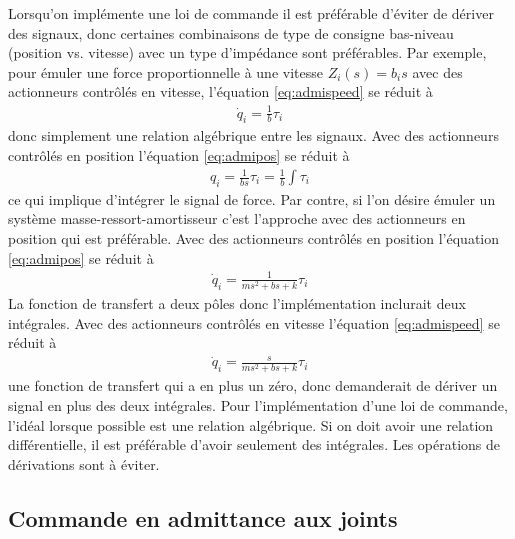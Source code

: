 Lorsqu'on implémente une loi de commande il est préférable d'éviter de dériver des signaux, donc certaines combinaisons de type de consigne bas-niveau (position vs. vitesse) avec un type d'impédance sont préférables. Par exemple, pour émuler une force proportionnelle à une vitesse $Z_i(s) = b_i s$ avec des actionneurs contrôlés en vitesse, l'équation \eqref{eq:admispeed} se réduit à
\begin{align}
	\dot{q}_i = \frac{1}{b} \tau_i
\end{align}
donc simplement une relation algébrique entre les signaux. Avec des actionneurs contrôlés en position l'équation \eqref{eq:admipos} se réduit à
\begin{align}
	q_i = \frac{1}{b s} \tau_i = \frac{1}{b} \int \tau_i
\end{align}
ce qui implique d'intégrer le signal de force. Par contre, si l'on désire émuler un système masse-ressort-amortisseur c'est l'approche avec des actionneurs en position qui est préférable. Avec des actionneurs contrôlés en position l'équation \eqref{eq:admipos} se réduit à
\begin{align}
	\dot{q}_i = \frac{1}{ms^2+bs+k} \tau_i
\end{align}
La fonction de transfert a deux pôles donc l'implémentation inclurait deux intégrales. Avec des actionneurs contrôlés en vitesse l'équation \eqref{eq:admispeed} se réduit à
\begin{align}
	\dot{q}_i = \frac{s}{ms^2+bs+k} \tau_i
\end{align}
une fonction de transfert qui a en plus un zéro, donc demanderait de dériver un signal en plus des deux intégrales. Pour l'implémentation d'une loi de commande, l'idéal lorsque possible est une relation algébrique. Si on doit avoir une relation différentielle, il est préférable d'avoir seulement des intégrales. Les opérations de dérivations sont à éviter.

\subsection{Commande en admittance aux joints}
\label{sec:jointadmcontrol}

